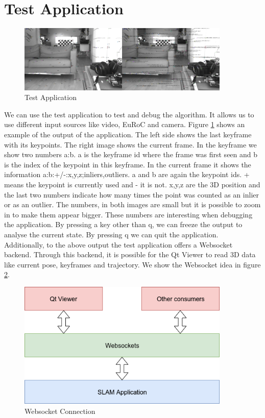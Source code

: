 \documentclass[11pt,a4paper,titlepage,oneside]{report}
\begin{document}
\section{Test Application}

\begin{figure}[H]
  \centering
  \includegraphics[width=0.9\textwidth]{img/test_app.png}
  \caption{Test Application}\label{fig:test_app}
\end{figure}

We can use the test application to test and debug the algorithm. It allows us to use different input sources like video, EuRoC and camera. Figure \ref{fig:test_app} shows an example of the output of the application. The left side shows the last keyframe with its keypoints. The right image shows the current frame. In the keyframe we show two numbers a:b. a is the keyframe id where the frame was first seen and b is the index of the keypoint in this keyframe. In the current frame it shows the information a:b:+/-:x,y,z;inliers,outliers. a and b are again the keypoint ids. + means the keypoint is currently used and - it is not. x,y,z are the 3D position and the last two numbers indicate how many times the point was counted as an inlier or as an outlier. The numbers, in both images are small but it is possible to zoom in to make them appear bigger. These numbers are interesting when debugging the application. By pressing a key other than q, we can freeze the output to analyse the current state. By pressing q we can quit the application.\\
Additionally, to the above output the test application offers a Websocket \cite{websocket} backend. Through this backend, it is possible for the Qt Viewer to read 3D data like current pose, keyframes and trajectory. We show the Websocket idea in figure \ref{fig:websocket}.

\begin{figure}[H]
  \centering
  \includegraphics[width=0.9\textwidth]{img/websocket.png}
  \caption{Websocket Connection}\label{fig:websocket}
\end{figure}
\end{document}
